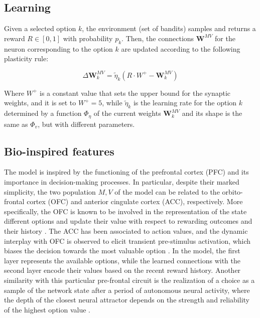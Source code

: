 \subsection{Learning}
Given a selected option $k$, the environment (set of bandits) samples and returns a reward $R\in [0, 1]$ with probability $p_{k}$.
Then, the connections $\textbf{W}^{MV}$ for the neuron corresponding to the option $k$ are updated according to the following plasticity rule:

\begin{equation}
    \Delta \textbf{W}^{MV}_{k} = \tilde{\eta}_{k} \left(R\cdot W^{+}- \textbf{W}^{MV}_{k}\right)
\end{equation}

\noindent
Where $W^{+}$ is a constant value that sets the upper bound for the synaptic weights, and it is set to $W^{+} = 5$, while $\tilde{\eta}_{k}$ is the learning rate for the option $k$ determined by a function $\Phi_{\eta}$ of the current weights $\textbf{W}^{MV}_{k}$ and its shape is the same as $\Phi_{v}$, but with
different parameters.


\subsection{Bio-inspired features}

The model is inspired by the functioning of the prefrontal cortex (PFC) and its importance in decision-making processes. In particular, despite their marked simplicity, the two population $M, V$ of the model can be related to the orbito-frontal cortex (OFC) and anterior cingulate cortex (ACC), respectively.
More specifically, the OFC is known to be involved in the representation of the state different options and update their value with respect to rewarding outcomes and their history \cite{lukChoiceCodingFrontal2013, kennerleyDecisionMakingReward2011a}. The ACC has been associated to action values, and the dynamic interplay with OFC is observed to elicit
transient pre-stimulus activation, which biases the decision towards the most valuable option \cite{funahashiPrefrontalContributionDecisionMaking2017, marcosDeterminingMonkeyFree2016, balewskiValueDynamicsAffect2023}. In the model, the first layer represents the available options, while the learned
connections with the second layer encode their values based on the recent reward history. Another similarity with this particular pre-frontal circuit is the realization of a choice as a sample of the network state after a period of autonomous neural activity, where the depth of the closest
neural attractor depends on the strength and reliability of the highest option value \cite{backmanEffectsWorkingMemoryTraining2011, enelStableDynamicRepresentations2020}.

